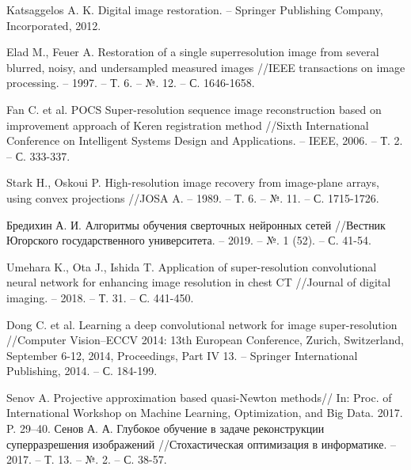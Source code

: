 \begin{thebibliography}{3}
    Katsaggelos A. K. Digital image restoration. – Springer Publishing Company, Incorporated, 2012.

    Elad M., Feuer A. Restoration of a single superresolution image from several blurred, noisy, and undersampled measured images //IEEE transactions on image processing. – 1997. – Т. 6. – №. 12. – С. 1646-1658.

    Fan C. et al. POCS Super-resolution sequence image reconstruction based on improvement approach of Keren registration method //Sixth International Conference on Intelligent Systems Design and Applications. – IEEE, 2006. – Т. 2. – С. 333-337.
    
    Stark H., Oskoui P. High-resolution image recovery from image-plane arrays, using convex projections //JOSA A. – 1989. – Т. 6. – №. 11. – С. 1715-1726.
    
    Бредихин А. И. Алгоритмы обучения сверточных нейронных сетей //Вестник Югорского государственного университета. – 2019. – №. 1 (52). – С. 41-54.

    Umehara K., Ota J., Ishida T. Application of super-resolution convolutional neural network for enhancing image resolution in chest CT //Journal of digital imaging. – 2018. – Т. 31. – С. 441-450.

    Dong C. et al. Learning a deep convolutional network for image super-resolution //Computer Vision–ECCV 2014: 13th European Conference, Zurich, Switzerland, September 6-12, 2014, Proceedings, Part IV 13. – Springer International Publishing, 2014. – С. 184-199.

    Senov A. Projective approximation based quasi-Newton methods// In: Proc. of International Workshop on Machine Learning, Optimization, and Big Data. 2017. P. 29–40.
    Сенов А. А. Глубокое обучение в задаче реконструкции суперразрешения изображений //Стохастическая оптимизация в информатике. – 2017. – Т. 13. – №. 2. – С. 38-57.
    
\end{thebibliography}
